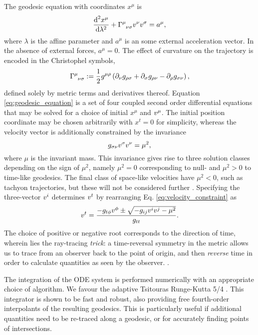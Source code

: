 The geodesic equation with coordinates $x^\mu$ is
\begin{equation}
\label{eq:geodesic_equation}
    \frac{\d^2 x^\mu}{\d \lambda^2}
    + \utensor{\Gamma}{\mu}{\nu\sigma}
    \vel{\nu}
    \vel{\sigma}
    = a^\mu,
\end{equation}
where $\lambda$ is the affine parameter and $a^\mu$ is an some external acceleration vector. In the absence of external forces, $a^\mu = 0$. The effect of curvature on the trajectory is encoded in the Christophel symbols, 
\begin{equation}
\label{eq:christoffel}
    \utensor{\Gamma}{\mu}{\nu\sigma}
    := \frac{1}{2} g^{\mu\rho} 
    \left(
        \partial_{\nu}g_{\rho \sigma}
        + \partial_{\sigma}g_{\rho \nu}
        - \partial_{\rho}g_{\sigma \nu}
    \right),
\end{equation}
defined solely by metric terms and derivatives thereof. Equation \eqref{eq:geodesic_equation} is a set of four coupled second order differential equations that may be solved for a choice of initial $x^\mu$ and $v^{\mu}$. The initial position coordinate may be chosen arbitrarily with $x^t = 0$ for simplicity, whereas the velocity vector is additionally constrained by the invariance
\begin{equation}
\label{eq:velocity_constraint}
    g_{\sigma\nu} v^{\sigma} v^{\nu} = \mu^2,
\end{equation}
where $\mu$ is the invariant mass. This invariance gives rise to three solution classes depending on the sign of $\mu^2$, namely $\mu^2 = 0$ corresponding to null- and $\mu^2 > 0$ to time-like geodesics. The final class of space-like velocities have $\mu^2 < 0$, such as tachyon trajectories, but these will not be considered further . Specifying the three-vector $v^{i}$ determines $v^{t}$ by rearranging Eq. \eqref{eq:velocity_constraint} as
\begin{equation}
v^{t}  = \frac{-g_{t\phi} v^{\phi} \pm
    \sqrt{-g_{ij} v^{i} v^{j} - \mu^2}
}{g_{tt}}.
\end{equation}
The choice of positive or negative root corresponds to the direction of time, wherein lies the ray-tracing \textit{trick}: a time-reversal symmetry in the metric allows us to trace from an observer back to the point of origin, and then \textit{reverse} time in order to calculate quantities as seen by the observer. .

The integration of the ODE system is performed numerically with an appropriate choice of algorithm. We favour the adaptive Tsitouras Runge-Kutta 5/4 \citep{tsitouras_rungekutta_2011}. This integrator is shown to be fast and robust, also providing free fourth-order interpolants of the resulting geodesics. This is particularly useful if additional quantities need to be re-traced along a geodesic, or for accurately finding points of intersections. 

